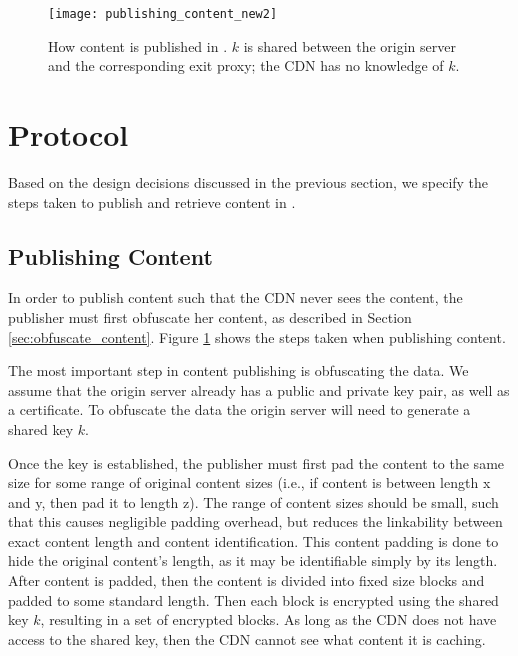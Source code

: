 \begin{figure}[t!]
\centering
\texttt{[image: publishing\_content\_new2]}
\caption{How content is published in \system{}.  $k$ is shared between the 
origin server and the corresponding exit proxy; the CDN has no knowledge of $k$.}
\label{fig:publishing}
\end{figure}

\section{\system{} Protocol}
\label{sec:protocol}
Based on the design decisions discussed in the previous section, we specify the 
steps taken to publish and retrieve content in \system{}.

\subsection{Publishing Content}
\label{sec:publish_protocol}
In order to publish content such that the CDN never sees the content, the publisher 
must first obfuscate her content, as described in Section \ref{sec:obfuscate_content}. 
Figure \ref{fig:publishing} shows the steps taken when publishing content.


The most important step in content publishing is obfuscating the data.  We assume that the origin 
server already has a public and private key pair, as well as a certificate.  To obfuscate the data 
the origin server will need to generate a shared key $k$. 

Once the key is established, the publisher must first pad the content to the same size for some 
range of original content sizes (i.e., if content is between length x and y, then pad it to length 
z).  The range of content sizes should be small, such that this causes negligible padding overhead, but 
reduces the linkability between exact content length and content identification.  This content padding 
is done to hide the original content's length, as it may be identifiable simply by its length.  After 
content is padded, then the content is divided into fixed size blocks and padded to 
some standard length.  Then each block is encrypted using the shared key $k$, 
resulting in a set of encrypted blocks. As long as the CDN does not have access to the shared key, 
then the CDN cannot see what content it is caching.  

